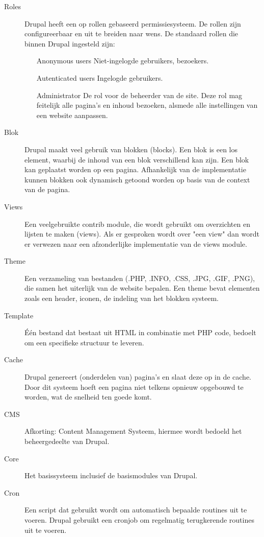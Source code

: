 \begin{description}
\item[Roles] Drupal heeft een op rollen gebaseerd permissiesysteem. De rollen zijn configureerbaar en uit te breiden naar wens. 
De standaard rollen die binnen Drupal ingesteld zijn:
\begin{itemize}
\item[Anonymous users] Niet-ingelogde gebruikers, bezoekers.
\item[Autenticated users] Ingelogde gebruikers.
\item[Administrator] De rol voor de beheerder van de site. Deze rol mag feitelijk alle pagina's en inhoud bezoeken, alsmede alle instellingen van een website aanpassen. 
\end{itemize}
\item[Blok] Drupal maakt veel gebruik van blokken (blocks). Een blok is een los element, waarbij de inhoud van een blok verschillend kan zijn. Een blok kan geplaatst worden op een pagina. Afhankelijk van de implementatie kunnen blokken ook dynamisch getoond worden op basis van de context van de pagina. 

\item[Views] Een veelgebruikte contrib module, die wordt gebruikt om overzichten en lijsten te maken (views). Als er gesproken wordt over "een view" dan wordt er verwezen naar een afzonderlijke implementatie van de views module. 

\item[Theme] Een verzameling van bestanden (.PHP, .INFO, .CSS, .JPG, .GIF, .PNG), die samen het uiterlijk van de website bepalen. Een theme bevat elementen zoals een header, iconen, de indeling van het blokken systeem. 

\item[Template] \'{E}\'{e}n bestand dat bestaat uit HTML in combinatie met PHP code, bedoelt om een specifieke structuur te leveren. 

\item[Cache] Drupal genereert (onderdelen van) pagina's en slaat deze op in de cache. Door dit systeem hoeft een pagina niet telkens opnieuw opgebouwd te worden, wat de snelheid ten goede komt. 

\item[CMS] Afkorting: Content Management Systeem, hiermee wordt bedoeld het beheergedeelte van Drupal. 

\item[Core] Het basissysteem inclusief de basismodules van Drupal. 

\item[Cron] Een script dat gebruikt wordt om automatisch bepaalde routines uit te voeren. Drupal gebruikt een cronjob om regelmatig terugkerende routines uit te voeren. 


\end{description}
